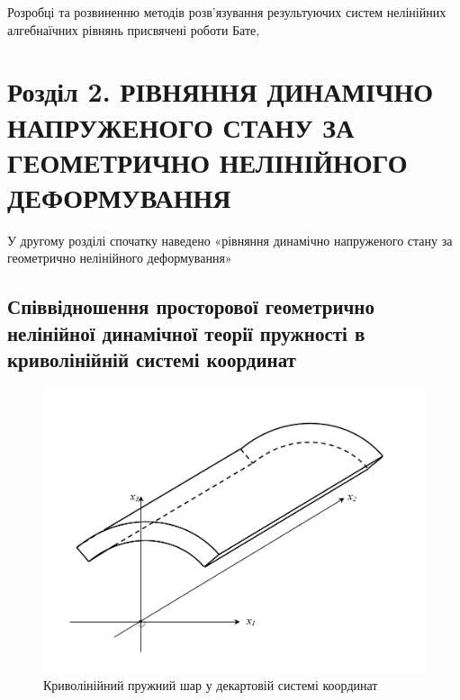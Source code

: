 \documentclass[10pt,a4paper]{article}
\numberwithin{figure}{section}
\numberwithin{equation}{section}
\begin{document}
\medskip 
Розробці та розвиненню методів розв'язування результуючих систем  нелінійних алгебнаїчних рівнянь присвячені роботи Бате,

\section{Розділ 2. РІВНЯННЯ ДИНАМІЧНО НАПРУЖЕНОГО СТАНУ ЗА ГЕОМЕТРИЧНО НЕЛІНІЙНОГО ДЕФОРМУВАННЯ}

У другому розділі спочатку наведено «рівняння динамічно напруженого стану за геометрично нелінійного деформування»

\subsection{Співвідношення просторової геометрично нелінійної динамічної теорії пружності в криволінійній системі координат
}

\begin{figure}
\begin{center}
			\includegraphics[scale=0.3]{pic/layer.png}			\end{center}
			\caption{Криволінійний пружний шар у декартовій системі координат}
			\label{fig:21}
		\end{figure}
		
\end{document}
